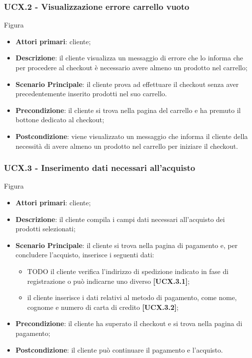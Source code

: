 \subsubsection{UCX.2 - Visualizzazione errore carrello vuoto}
Figura \\
\begin{itemize}
\item \textbf{Attori primari}: cliente;
\item \textbf{Descrizione}: il cliente visualizza un messaggio di errore che lo informa che per procedere al checkout è necessario avere almeno un prodotto nel carrello;
\item \textbf{Scenario Principale}: il cliente prova ad effettuare il checkout senza aver precedentemente inserito prodotti nel suo carrello.
\item \textbf{Precondizione}: il cliente si trova nella pagina del carrello e ha premuto il bottone dedicato al checkout;
\item \textbf{Postcondizione}: viene visualizzato un messaggio che informa il cliente della necessità di avere almeno un prodotto nel carrello per iniziare il checkout.
\end{itemize}

\subsubsection{UCX.3 - Inserimento dati necessari all'acquisto}
Figura \\
\begin{itemize}
\item \textbf{Attori primari}: cliente;
\item \textbf{Descrizione}: il cliente compila i campi dati necessari all'acquisto dei prodotti selezionati;
\item \textbf{Scenario Principale}: il cliente si trova nella pagina di pagamento e, per concludere l'acquisto, inserisce i seguenti dati:
\begin{itemize}
	\item TODO il cliente verifica l'indirizzo di spedizione indicato in fase di registrazione o può indicarne uno diverso \textbf{[UCX.3.1]};
	\item il cliente inserisce i dati relativi al metodo di pagamento, come nome, cognome e numero di carta di credito \textbf{[UCX.3.2]};
\end{itemize}
\item \textbf{Precondizione}: il cliente ha superato il checkout e si trova nella pagina di pagamento;
\item \textbf{Postcondizione}: il cliente può continuare il pagamento e l'acquisto.
\end{itemize}


